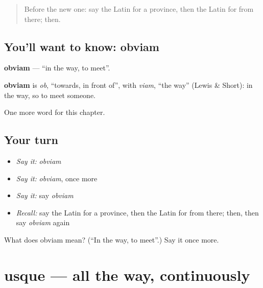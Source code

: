 \label{lesson:LA-C209-obviam}



\begin{quote}
Before the new one: say the Latin for a province, then the Latin for from there; then.
\end{quote}

\subsection*{You'll want to know: obviam}
\textbf{obviam} — \textquotedblleft{}in the way, to meet\textquotedblright{}.

\begin{cousinweb}
\textbf{obviam} is \emph{ob}, \textquotedblleft{}towards, in front of\textquotedblright{}, with \emph{viam}, \textquotedblleft{}the way\textquotedblright{} (Lewis \& Short): in the way, so to meet someone.
\end{cousinweb}

\begin{grammarlens}[title={What you've built}]
One more word for this chapter.
\end{grammarlens}

\subsection*{Your turn}
\begin{itemize}
\raggedright
  \item \emph{Say it:} \emph{obviam}
  \item \emph{Say it:} \emph{obviam}, once more
  \item \emph{Say it:} say \emph{obviam}
  \item \emph{Recall:} say the Latin for a province, then the Latin for from there; then, then say \emph{obviam} again
\end{itemize}

\begin{tcolorbox}[breakable,colback=teal!4,colframe=teal!35!black,title={Before you move on}]
What does obviam mean? (\textquotedblleft{}In the way, to meet\textquotedblright{}.) Say it once more.
\end{tcolorbox}
\section[usque]{usque — all the way, continuously}

\label{lesson:LA-C209-usque}



